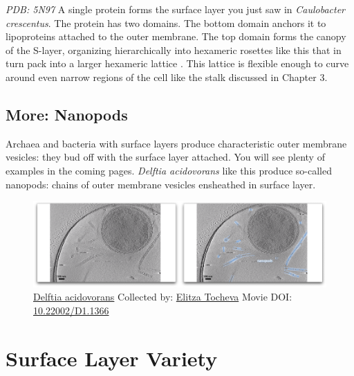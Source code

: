 \documentclass[]{tufte-book}
\begin{document}
\emph{PDB: 5N97} A single protein forms the surface layer you just saw
in \emph{Caulobacter crescentus}. The protein has two domains. The
bottom domain anchors it to lipoproteins attached to the outer membrane.
The top domain forms the canopy of the S-layer, organizing
hierarchically into hexameric rosettes like this that in turn pack into
a larger hexameric lattice \citep{bharat2017}. This lattice is flexible
enough to curve around even narrow regions of the cell like the stalk
discussed in Chapter 3.

\hypertarget{Nanopods}{\subsection*{More: Nanopods}\label{Nanopods}}

Archaea and bacteria with surface layers produce characteristic outer
membrane vesicles: they bud off with the surface layer attached. You
will see plenty of examples in the coming pages. \emph{Delftia
acidovorans} like this produce so-called nanopods: chains of outer
membrane vesicles ensheathed in surface layer.





\begin{figure}
\includegraphics{movie_stills/2_6a} \caption[\protect\hyperlink{tree}{Delftia acidovorans} Collected by:
\protect\hyperlink{elitza_tocheva}{Elitza Tocheva} Movie DOI:
\href{https://doi.org/10.22002/D1.1366}{10.22002/D1.1366}]{\protect\hyperlink{tree}{Delftia acidovorans} Collected by:
\protect\hyperlink{elitza_tocheva}{Elitza Tocheva} Movie DOI:
\href{https://doi.org/10.22002/D1.1366}{10.22002/D1.1366}}\label{fig:2-6a}
\end{figure}

\section{Surface Layer Variety}\label{surface-layer-variety}
\end{document}
